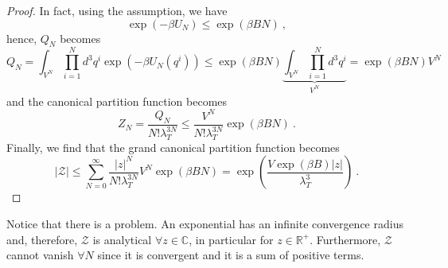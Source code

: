     \begin{proof}
        In fact, using the assumption, we have
        \begin{equation*}
            \exp(- \beta U_N) \leq \exp(\beta B N) ~,
        \end{equation*}
        hence, $Q_N$ becomes
        \begin{equation*}
            Q_N = \int_{V^N} \prod_{i=1}^N d^3 q^i \exp (- \beta U_N(q^i)) \leq \exp(\beta B N) \underbrace{\int_{V^N}\prod_{i=1}^N d^3 q^i}_{V^N} = \exp(\beta B N) V^N 
        \end{equation*}
        and the canonical partition function becomes
        \begin{equation*}
            Z_N = \frac{Q_N}{N! \lambda_T^{3N}} \leq \frac{V^N}{N! \lambda^{3N}_T} \exp(\beta B N) ~.
        \end{equation*}
        Finally, we find that the grand canonical partition function becomes
        \begin{equation*}
            |\mathcal Z| \leq \sum_{N=0}^\infty \frac{|z|^N}{N! \lambda_T^{3N}} V^N \exp(\beta B N) = \exp(\frac{V \exp(\beta B) |z|}{\lambda_T^3}) ~.
        \end{equation*}
    \end{proof}
    Notice that there is a problem. An exponential has an infinite convergence radius and, therefore, $\mathcal Z$ is analytical $\forall z \in \mathbb C$, in particular for $z \in \mathbb R^+$. Furthermore, $\mathcal Z$ cannot vanish $\forall N$ since it is convergent and it is a sum of positive terms. 


